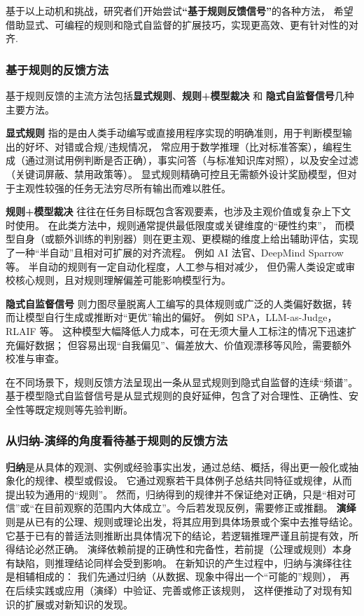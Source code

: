 基于以上动机和挑战，研究者们开始尝试\textbf{“基于规则反馈信号”}的各种方法，
希望借助显式、可编程的规则和隐式自监督的扩展技巧，实现更高效、更有针对性的对齐. 

\subsubsection{基于规则的反馈方法}
基于规则反馈的主流方法包括\textbf{显式规则}、\textbf{规则+模型裁决} 和 \textbf{隐式自监督信号}几种主要方法。

\textbf{显式规则 }指的是由人类手动编写或直接用程序实现的明确准则，用于判断模型输出的好坏、对错或合规/违规情况，
常应用于数学推理（比对标准答案），编程生成（通过测试用例判断是否正确），事实问答（与标准知识库对照），以及安全过滤（关键词屏蔽、禁用政策等）。
显式规则精确可控且无需额外设计奖励模型，但对于主观性较强的任务无法穷尽所有输出而难以胜任。

\textbf{规则+模型裁决 }往往在任务目标既包含客观要素，也涉及主观价值或复杂上下文时使用。
在此类方法中，规则通常提供最低限度或关键维度的“硬性约束”，
而模型自身（或额外训练的判别器）则在更主观、更模糊的维度上给出辅助评估，实现了一种“半自动”且相对可扩展的对齐流程。
例如 AI 法官\citep{bai2022constitutional}、DeepMind Sparrow 等。
半自动的规则有一定自动化程度，人工参与相对减少，
但仍需人类设定或审校核心规则，且对规则理解偏差可能影响模型行为。

\textbf{隐式自监督信号 }则力图尽量脱离人工编写的具体规则或广泛的人类偏好数据，转而让模型自行生成或推断对“更优”输出的偏好。
例如 SPA\citep{Kim2025Spread}，LLM-as-Judge\citep{Li2024LLMs}，RLAIF\citep{Lee2024Rlaif} 等。
这种模型大幅降低人力成本，可在无须大量人工标注的情况下迅速扩充偏好数据；
但容易出现“自我偏见”、偏差放大、价值观漂移等风险，需要额外校准与审查。

在不同场景下，规则反馈方法呈现出一条从显式规则到隐式自监督的连续“频谱”。
基于模型隐式自监督信号是从显式规则的良好延伸，包含了对合理性、正确性、安全性等既定规则等先验判断。

\subsubsection{从归纳-演绎的角度看待基于规则的反馈方法}
\textbf{归纳}是从具体的观测、实例或经验事实出发，通过总结、概括，得出更一般化或抽象化的规律、模型或假设。
它通过观察若干具体例子总结共同特征或规律，从而提出较为通用的“规则”。
然而，归纳得到的规律并不保证绝对正确，只是“相对可信”或“在目前观察的范围内大体成立”。今后若发现反例，需要修正或推翻。
\textbf{演绎}则是从已有的公理、规则或理论出发，将其应用到具体场景或个案中去推导结论。
它基于已有的普适法则推断出具体情况下的结论，若逻辑推理严谨且前提有效，所得结论必然正确。
演绎依赖前提的正确性和完备性，若前提（公理或规则）本身有缺陷，则推理结论同样会受到影响。
在新知识的产生过程中，归纳与演绎往往是相辅相成的：
我们先通过归纳（从数据、现象中得出一个“可能的”规则），
再在后续实践或应用（演绎）中验证、完善或修正该规则，
这样便推动了对现有知识的扩展或对新知识的发现。

